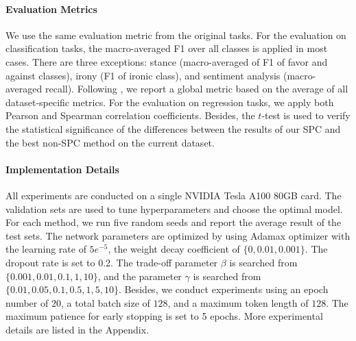 \documentclass[letterpaper]{article} %
\begin{document}
\paragraph{Evaluation Metrics} \label{sec:eval}
We use the same evaluation metric from the original tasks.
For the evaluation on classification tasks, the macro-averaged F1 over all classes is applied in most cases. There are three exceptions: stance (macro-averaged of F1 of favor and against classes), irony (F1 of ironic class), and sentiment analysis (macro-averaged recall). 
Following \citet{DBLP:conf/emnlp/BarbieriCAN20}, 
we report a global metric based on the average of all dataset-specific metrics.
For the evaluation on regression tasks, 
we apply both Pearson and Spearman correlation coefficients. 
Besides, the $t$-test \cite{kim2015t} is used to verify the statistical significance of the differences between the results of our SPC and the best non-SPC method on the current dataset.


\paragraph{Implementation Details}
All experiments are conducted on a single NVIDIA Tesla A100 80GB card. 
The validation sets are used to tune hyperparameters and choose the optimal model.
For each method, we run five random seeds and report the average result of the test sets.
The network parameters are optimized by using Adamax optimizer \citep{DBLP:journals/corr/KingmaB14} with the learning rate of $5e^{-5}$, the weight decay coefficient of $\{0, 0.01, 0.001\}$. The dropout rate is set to 0.2.
The trade-off parameter $\beta$ is searched from $\{0.001, 0.01, 0.1, 1, 10\}$, and the parameter $\gamma$  is searched from $\{0.01, 0.05, 0.1, 0.5, 1, 5, 10\}$. 
Besides, we conduct experiments using an epoch number of $20$, a total batch size of $128$, and a maximum token length of $128$.
The maximum patience for early stopping is set to 5 epochs. 
More experimental details are listed in the Appendix.
\end{document}
